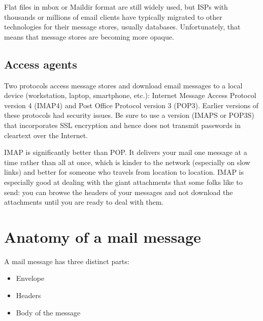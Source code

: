 Flat files in {mbox} or {Maildir} format are still widely used, but ISPs
with thousands or millions of email clients have typically migrated to
other technologies for their message stores, usually databases.
Unfortunately, that means that message stores are becoming more opaque.

\protect\hypertarget{part0026_split_007.html}{}{}

\hypertarget{part0026_split_007.htmlux5cux23_idContainer1247}{}
\hypertarget{part0026_split_007.htmlux5cux23calibre_pb_6}{%
\subsection[Access
agents]{\texorpdfstring{\protect\hypertarget{part0026_split_007.htmlux5cux23_idTextAnchor1009}{}{}Access
agents}{Access agents}}\label{part0026_split_007.htmlux5cux23calibre_pb_6}}

\protect\hypertarget{part0026_split_007.htmlux5cux23_idIndexMarker2419}{}{}\protect\hypertarget{part0026_split_007.htmlux5cux23_idIndexMarker2420}{}{}\protect\hypertarget{part0026_split_007.htmlux5cux23_idIndexMarker2421}{}{}Two
protocols access message stores and download email messages to a local
device (workstation, laptop, smartphone, etc.): Internet Message Access
Protocol {version 4} (IMAP4) and Post Office Protocol version 3 (POP3).
Earlier versions of these protocols had security issues. Be sure to use
a version (IMAPS or POP3S) that incorporates SSL encryption and hence
does not transmit passwords in cleartext over the Internet.

IMAP is significantly better than POP. It delivers your mail one message
at a time rather than all at once, which is kinder to the network
(especially on slow links) and better for someone who travels from
location to location. IMAP is especially good at dealing with the giant
attachments that some folks like to send: you can browse the headers of
your messages and not download the attachments until you are ready to
deal with them.



\section{Anatomy of a mail message}

A mail message has three distinct parts:

\begin{itemize}
\tightlist
\item
  Envelope
\item
  Headers
\item
  Body of the message
\end{itemize}


